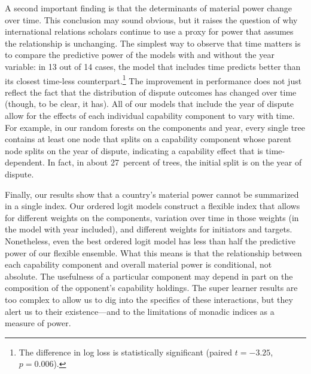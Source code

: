 A second important finding is that the determinants of material power change over time.
This conclusion may sound obvious, but it raises the question of why international relations scholars continue to use a proxy for power that assumes the relationship is unchanging.
The simplest way to observe that time matters is to compare the predictive power of the models with and without the year variable: in 13 out of 14 cases, the model that includes time predicts better than its closest time-less counterpart.\footnote{%
  The difference in log loss is statistically significant (paired $t = -3.25$, $p = 0.006$).
}
The improvement in performance does not just reflect the fact that the distribution of dispute outcomes has changed over time (though, to be clear, it has).
All of our models that include the year of dispute allow for the effects of each individual capability component to vary with time.
For example, in our random forests on the components and year, every single tree contains at least one node that splits on a capability component whose parent node splits on the year of dispute, indicating a capability effect that is time-dependent.
In fact, in about 27~percent of trees, the initial split is on the year of dispute.

Finally, our results show that a country's material power cannot be summarized in a single index.
Our ordered logit models construct a flexible index that allows for different weights on the components, variation over time in those weights (in the model with year included), and different weights for initiators and targets.
Nonetheless, even the best ordered logit model has less than half the predictive power of our flexible ensemble.
What this means is that the relationship between each capability component and overall material power is conditional, not absolute.
The usefulness of a particular component may depend in part on the composition of the opponent's capability holdings.
The super learner results are too complex to allow us to dig into the specifics of these interactions, but they alert us to their existence---and to the limitations of monadic indices as a measure of power.


